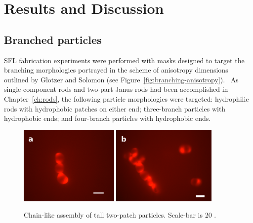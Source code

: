 \section{Results and Discussion}

\subsection{Branched particles}


SFL fabrication experiments were performed with masks designed to target the branching morphologies
portrayed in the scheme of anisotropy dimensions outlined by Glotzer and Solomon
(see Figure~\ref{fig:branching-anisotropy}).~\cite{glotzer-solomon}  As single-component rods and 
two-part Janus rods had been accomplished in Chapter~\ref{ch:rods}, the following particle 
morphologies were targeted: hydrophilic rods with hydrophobic patches on either end; three-branch particles
with hydrophobic ends; and four-branch particles with hydrophobic ends.


\begin{figure}[h]
\begin{center}
\includegraphics[height=1.5in]{figures/complex-shapes/twopatch-3chain-sb20.png} \includegraphics[height=1.5in]{figures/complex-shapes/twopatch-flchain-sb20.png}
\end{center}
\caption{Chain-like assembly of tall two-patch particles. Scale-bar is 20 \microns.}
\label{fig:tall-2patch}
\end{figure}

